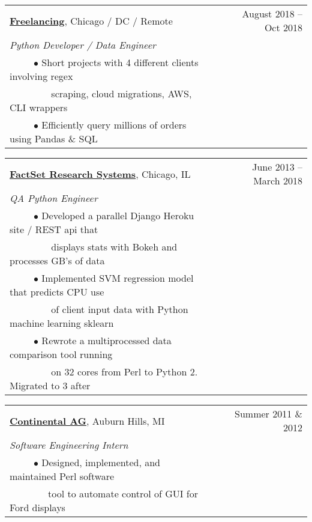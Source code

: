 \documentclass[11pt]{article}
\begin{document}
\vspace{0.4cm}

\begin{tabularx}{\linewidth}{l X r}
\textbf{\href{https://www.upwork.com/freelancers/~0146e5e5e6eefb0f2a}{Freelancing}}, Chicago / DC / Remote & & August 2018 -- Oct 2018 \\
\emph{Python Developer / Data Engineer} \\
~~~~~$\bullet$ Short projects with 4 different clients involving regex \\
~~~~~~~~ scraping, cloud migrations, AWS, CLI wrappers\\
~~~~~$\bullet$ Efficiently query millions of orders using Pandas \& SQL\\
\end{tabularx}

\vspace{0.4cm}

\begin{tabularx}{\linewidth}{l X r}
\textbf{\href{https://www.factset.com/}{FactSet Research Systems}}, Chicago, IL & & June 2013 -- March 2018 \\
\emph{QA Python Engineer} \\
~~~~~$\bullet$ Developed a parallel Django Heroku site / REST api that\\
~~~~~~~~ displays stats with Bokeh and processes GB's of data \\
~~~~~$\bullet$ Implemented SVM regression model that predicts CPU use \\
~~~~~~~~ of client input data with Python machine learning sklearn\\
~~~~~$\bullet$ Rewrote a multiprocessed data comparison tool running\\
~~~~~~~~ on 32 cores from Perl to Python 2. Migrated to 3 after\\
\end{tabularx}

\vspace{0.4cm}

\begin{tabularx}{\linewidth}{l X r}
\textbf{\href{https://www.continental-corporation.com/en}{Continental AG}}, Auburn Hills, MI & & Summer 2011 \& 2012 \\
\emph{Software Engineering Intern} \\
~~~~~$\bullet$ Designed, implemented, and maintained Perl software \\
~~~~~~~~tool to automate control of GUI for Ford displays\\
\end{tabularx}
\end{document}
